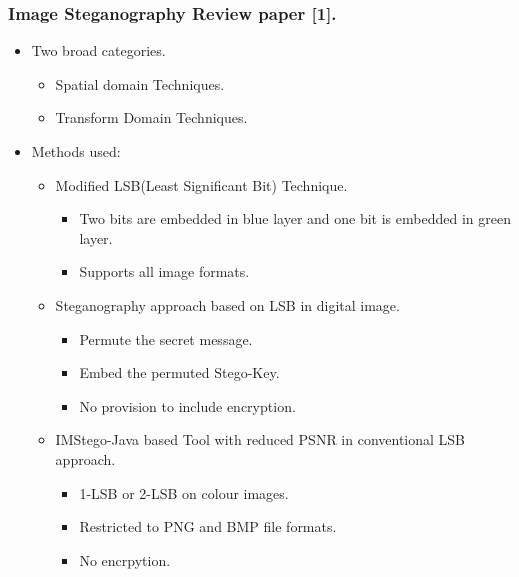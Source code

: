 \documentclass{beamer} %
\theoremstyle{definition} %
\begin{document}
\begin{frame}
\frametitle{Image Steganography Review paper [1].}
\begin{itemize}
	\item{ Two broad categories.}
	\begin{itemize}
		\item Spatial domain Techniques.
		\item Transform Domain Techniques.
	\end{itemize}
	\item{Methods used:}
	\begin{itemize}
		\item{Modified LSB(Least Significant Bit) Technique. }
		\begin{itemize}
			\item Two bits are embedded in blue layer and one bit is embedded in green layer.
			\item Supports all image formats.
		\end{itemize}
		\item{Steganography approach based on LSB in digital image.}
		\begin{itemize}
			\item Permute the secret message.
			\item Embed the permuted Stego-Key.
			\item No provision to include encryption.
		\end{itemize}
		\item{IMStego-Java based Tool with reduced PSNR in conventional LSB approach. }
		\begin{itemize}
		 \item 1-LSB or 2-LSB on colour images.
		 \item Restricted to PNG and BMP file formats. 	
		 \item No encrpytion.
		\end{itemize}
	\end{itemize}
\end{itemize}
\end{frame}
\end{document}
